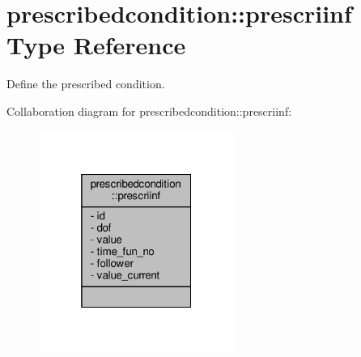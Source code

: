 \hypertarget{structprescribedcondition_1_1prescriinf}{}\section{prescribedcondition\+:\+:prescriinf Type Reference}
\label{structprescribedcondition_1_1prescriinf}


Define the prescribed condition.  




Collaboration diagram for prescribedcondition\+:\+:prescriinf\+:\nopagebreak
\begin{figure}[H]
\begin{center}
\leavevmode
\includegraphics[width=181pt]{structprescribedcondition_1_1prescriinf__coll__graph}
\end{center}
\end{figure}
